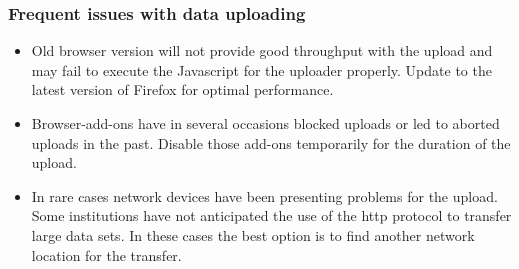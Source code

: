 \documentclass[letterpaper,10pt,english]{sphinxmanual}
\begin{document}
\subsubsection{Frequent issues with data uploading}
\label{\detokenize{faq:frequent-issues-with-data-uploading}}\begin{itemize}
\item {} 
Old browser version will not provide good throughput with the upload
and may fail to execute the Javascript for the uploader properly.
Update to the latest version of Firefox for optimal performance.

\item {} 
Browser-add-ons have in several occasions blocked uploads or led to
aborted uploads in the past. Disable those add-ons temporarily for
the duration of the upload.

\item {} 
In rare cases network devices have been presenting problems for the
upload. Some institutions have not anticipated the use of the http
protocol to transfer large data sets. In these cases the best option
is to find another network location for the transfer.

\end{itemize}
\end{document}
